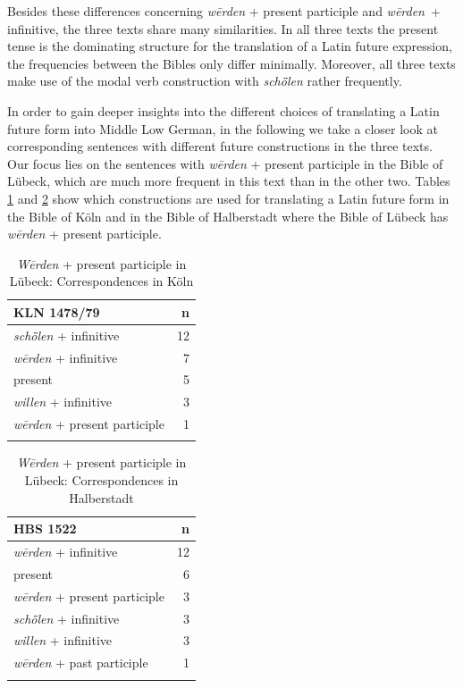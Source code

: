 \documentclass[output=paper,colorlinks,citecolor=brown]{langscibook}
\begin{document}
Besides these differences concerning \textit{wērden} + present participle and \textit{wērden}~+ infinitive, the three texts share many similarities. In all three texts the present tense is the dominating structure for the translation of a Latin future expression, the frequencies between the Bibles only differ minimally. Moreover, all three texts make use of the modal verb construction with \textit{schȫlen} rather frequently.

In order to gain deeper insights into the different choices of translating a Latin future form into Middle Low German, in the following we take a closer look at corresponding sentences with different future constructions in the three texts. Our focus lies on the sentences with \textit{wērden} + present participle in the Bible of Lübeck, which are much more frequent in this text than in the other two. Tables \ref{tab:ihden_schnee:correspKLN} and \ref{tab:ihden_schnee:correspHBS} show which constructions are used for translating a Latin future form in the Bible of Köln and in the Bible of Halberstadt where the Bible of Lübeck has \textit{wērden} + present participle.

\begin{table}
\caption{\textit{Wērden} + present participle in Lübeck: Correspondences in Köln}
\label{tab:ihden_schnee:correspKLN}
 \begin{tabularx}{.5\textwidth}{X r}
  \lsptoprule
  KLN 1478/79 & n \\
  \midrule
  \textit{schȫlen} + infinitive &   12  \\
  \textit{wērden} + infinitive  &   7 \\
  present & 5 \\
  \textit{willen} + infinitive & 3\\
  \textit{wērden} + present participle & 1\\
  \lspbottomrule
 \end{tabularx}
\end{table}
\begin{table}
\caption{\textit{Wērden} + present participle in Lübeck: Correspondences in Halberstadt}
\label{tab:ihden_schnee:correspHBS}
 \begin{tabularx}{.5\textwidth}{X r}
  \lsptoprule
  HBS 1522 & n \\
  \midrule
  \textit{wērden} + infinitive &   12  \\
  present  &   6 \\
  \textit{wērden} + present participle & 3 \\
  \textit{schȫlen} + infinitive & 3 \\
  \textit{willen} + infinitive & 3\\
  \textit{wērden} + past participle & 1\\
  \lspbottomrule
 \end{tabularx}
\end{table}
\end{document}

